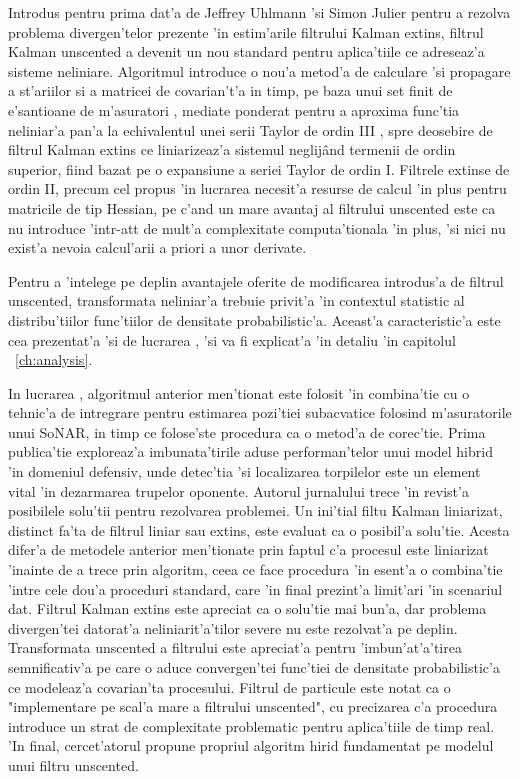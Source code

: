 \documentclass[12pt,a4paper,twoside]{report}
\begin{document}
Introdus pentru prima dat'a de Jeffrey Uhlmann 'si Simon Julier \cite{1271397} pentru a rezolva problema divergen'telor prezente 'in estim'arile filtrului Kalman extins, filtrul Kalman unscented a devenit un nou standard pentru aplica'tiile ce adreseaz'a sisteme neliniare. Algoritmul introduce o nou'a metod'a de calculare 'si propagare a st'ariilor si a matricei de covarian't'a in timp, pe baza unui set finit de e'santioane de m'asuratori , mediate ponderat pentru a aproxima func'tia neliniar'a pan'a la echivalentul unei serii Taylor de ordin III \cite{882463}, spre deosebire de filtrul Kalman extins ce liniarizeaz'a sistemul neglij\^{a}nd termenii de ordin superior, fiind bazat pe o expansiune a seriei Taylor de ordin I. Filtrele extinse de ordin II, precum cel propus 'in lucrarea \cite{7952985} necesit'a resurse de calcul 'in plus pentru matricile de tip Hessian, pe c'and un mare avantaj al filtrului unscented este ca nu introduce 'intr-at\ia t de mult'a complexitate computa'tionala 'in plus, 'si nici nu exist'a nevoia calcul'arii a priori a unor derivate.

\vspace{5px}

Pentru a 'intelege pe deplin avantajele oferite de modificarea introdus'a de filtrul unscented, transformata neliniar'a trebuie privit'a 'in contextul statistic al distribu'tiilor func'tiilor de densitate probabilistic'a. Aceast'a caracteristic'a este cea prezentat'a 'si de lucrarea \cite{882463}, 'si va fi explicat'a 'in detaliu 'in capitolul ~\ref{ch:analysis}.

\vspace{5px}

In lucrarea \cite{RAVIKUMAR2021165813}, algoritmul anterior men'tionat este folosit 'in combina'tie cu o tehnic'a de intregrare pentru estimarea pozi'tiei subacvatice folosind m'asuratorile unui SoNAR, in timp ce \cite{rs13204167} folose'ste procedura ca o metod'a de corec'tie. Prima publica'tie exploreaz'a imbunata'tirile aduse performan'telor unui model hibrid 'in domeniul defensiv, unde detec'tia 'si localizarea torpilelor este un element vital 'in dezarmarea trupelor oponente. Autorul jurnalului trece 'in revist'a posibilele solu'tii pentru rezolvarea problemei. Un ini'tial filtu Kalman liniarizat, distinct fa'ta de filtrul liniar sau extins, este evaluat ca o posibil'a solu'tie. Acesta difer'a de metodele anterior men'tionate prin faptul c'a procesul este liniarizat 'inainte de a trece prin algoritm, ceea ce face procedura 'in esent'a o combina'tie 'intre cele dou'a proceduri standard, care 'in final prezint'a limit'ari 'in scenariul dat. Filtrul Kalman extins este apreciat ca o solu'tie mai bun'a, dar problema divergen'tei datorat'a neliniarit'a'tilor severe nu este rezolvat'a pe deplin. Transformata unscented a filtrului este apreciat'a pentru 'imbun'at'a'tirea semnificativ'a pe care o aduce convergen'tei func'tiei de densitate probabilistic'a ce modeleaz'a covarian'ta procesului. Filtrul de particule este notat ca o "implementare pe scal'a mare a filtrului unscented", cu precizarea c'a procedura introduce un strat de complexitate problematic pentru aplica'tiile de timp real. 'In final, cercet'atorul propune propriul algoritm hirid fundamentat pe modelul unui filtru unscented.
\end{document}
